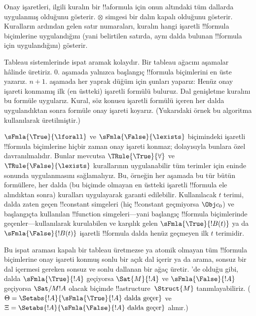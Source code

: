 \documentclass[../../../include/open-logic-section]{subfiles}
\begin{document}
Onay işaretleri, ilgili kuralın bir !!a{formula} için onun altındaki
tüm dallarda uygulanmış olduğunu gösterir. $\otimes$ simgesi bir dalın
kapalı olduğunu gösterir. Kuralların ardından gelen satır numaraları,
kuralın hangi işaretli !!{formula} biçimlerine uygulandığını (yani belirtilen
satırda, aynı dalda bulunan !!{formula} için uygulandığını) gösterir.

Tableau sistemlerinde ispat aramak kolaydır. Bir tableau ağacını aşamalar hâlinde
üretiriz. $0$. aşamada yalnızca başlangıç !!{formula} biçimlerini en üste
yazarız. $n+1$. aşamada her yaprak düğüm için şunları yaparız: Henüz
onay işareti konmamış ilk (en üstteki) işaretli formülü buluruz. Dal
genişletme kuralını bu formüle uygularız. Kural, söz konusu işaretli
formülü içeren her dalda uygulandıktan sonra formüle onay işareti
koyarız. (Yukarıdaki örnek bu algoritma kullanılarak üretilmiştir.)

$\sFmla{\True}{\lforall}$ ve $\sFmla{\False}{\lexists}$ biçimindeki
işaretli !!{formula} biçimlerine hiçbir zaman onay işareti konmaz; dolayısıyla
bunlara özel davranılmalıdır. Bunlar mevcutsa $\TRule{\True}{\forall}$
ve $\TRule{\False}{\lexists}$ kurallarının uygulanabilir tüm terimler
için eninde sonunda uygulanmasını sağlamalıyız. Bu, örneğin her aşamada
bu tür bütün formüllere, her dalda (bu biçimde olmayan en üstteki
işaretli !!{formula} ele alındıktan sonra) kuralları uygulayarak garanti
edilebilir. Kullanılacak $t$ terimi, dalda zaten geçen !!{constant} simgeleri
(hiç !!{constant} geçmiyorsa $\Obj c_0$) ve başlangıçta kullanılan
!!{function} simgeleri---yani başlangıç !!{formula} biçimlerinde
geçenler---kullanılarak kurulabilen ve
karşılık gelen $\sFmla{\True}{!B(t)}$ ya da
$\sFmla{\False}{!B(t)}$ işaretli !!{formula} dalda henüz geçmeyen ilk
$t$ terimidir.

Bu ispat araması kapalı bir tableau üretmezse ya atomik olmayan tüm
!!{formula} biçimlerine onay işareti konmuş sonlu bir açık dal içerir ya da
arama, sonsuz bir dal içermesi gereken sonsuz ve sonlu dallanan bir
ağaç üretir. 'de olduğu gibi, dalda
$\sFmla{\True}{!A}$ geçiyorsa $\Sat{M}{!A}$ ve
$\sFmla{\False}{!A}$ geçiyorsa $\Sat/{M}{!A}$ olacak biçimde
!!a{structure}~$\Struct{M}$ tanımlayabiliriz. ($\Theta =
\Setabs{!A}{\sFmla{\True}{!A} \text{ dalda geçer}}$ ve $\Xi =
\Setabs{!A}{\sFmla{\False}{!A} \text{ dalda geçer}}$ alınır.)
\end{document}
